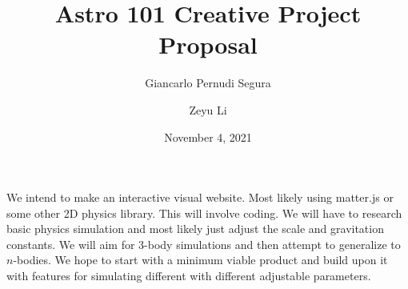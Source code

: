 \documentclass{article}
\title{Astro 101 Creative Project Proposal}
\author[1]{Giancarlo Pernudi Segura}
\affil{pernudi@ualberta.ca}
\author[2]{Zeyu Li}
\affil{zeyu7@ualberta.ca}
\date{November 4, 2021}
\begin{document}
\maketitle

We intend to make an interactive visual website. Most likely using matter.js or some other 2D physics library. This will involve coding. We will have to research basic physics simulation and most likely just adjust the scale and gravitation constants. We will aim for 3-body simulations and then attempt to generalize to $n$-bodies. We hope to start with a minimum viable product and build upon it with features for simulating different with different adjustable parameters.
\end{document}
